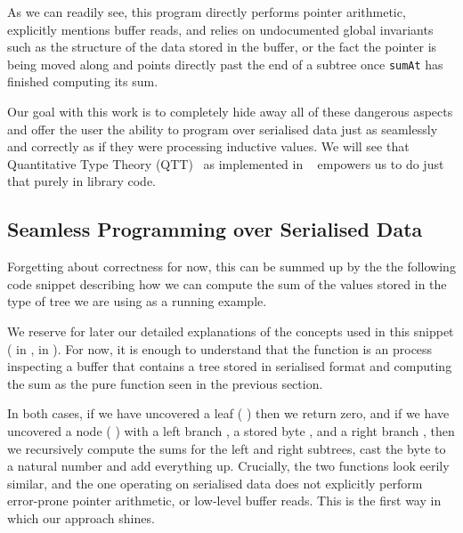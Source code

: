 As we can readily see, this program
directly performs pointer arithmetic,
explicitly mentions buffer reads,
and relies on undocumented global invariants
such as the structure of the data stored in the buffer,
or the fact the pointer is being moved along and points directly past
the end of a subtree once \texttt{sumAt} has finished computing
its sum.

Our goal with this work is to completely hide away all of these
dangerous aspects
and offer the user the ability to program over serialised data
just as seamlessly and correctly as
if they were processing inductive values.
%
We will see that
Quantitative Type Theory (QTT)~\cite{DBLP:conf/birthday/McBride16, DBLP:conf/lics/Atkey18}
as implemented in \idris{}~\cite{DBLP:conf/ecoop/Brady21}
empowers us to do just that purely in library code.

\subsection{Seamless Programming over Serialised Data}\label{sec:seamless}

Forgetting about correctness for now, this can be summed up by the
the following code snippet describing how we can compute the sum
of the values stored in the type of tree we are using as a running
example.



\begin{center}
  \begin{minipage}{.5\textwidth}
  \end{minipage}
\end{center}

We reserve for later our detailed explanations of the concepts
used in this snippet
( in ,
 in ).
%
For now, it is enough to understand that the function
is an  process
inspecting a buffer that contains a tree stored in serialised format
and computing the sum as the pure function seen in the previous section.

In both cases, if we have uncovered a leaf
({ \IdrisData{\#}} \IdrisKeyword{\KatlaUnderscore{}})
then we return zero,
and if we have uncovered a node
({ \IdrisData{\#}}  \IdrisData{\#}  \IdrisData{\#} )
with
a left branch ,
a stored byte ,
and a right branch ,
then we recursively compute the sums for the left and right subtrees,
cast the byte to a natural number and add everything up.
%
Crucially, the two functions look eerily similar, and the one operating on
serialised data does not explicitly perform error-prone pointer arithmetic,
or low-level buffer reads.
%
This is the first way in which our approach shines.

